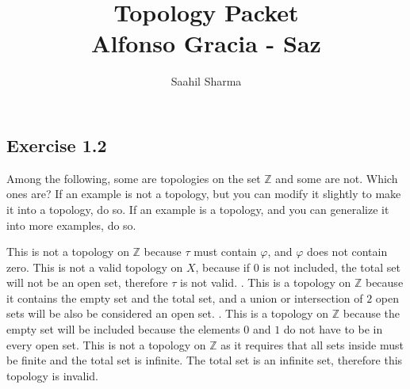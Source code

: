 \documentclass{report}
\title{\Huge{Topology Packet}\\Alfonso Gracia - Saz}
\author{\huge{Saahil Sharma}}
\date{}
\begin{document}
\maketitle
\newpage
{}
\tableofcontents
\pagebreak

\chapter{}
\section{Exercise 1.2}
\begin{center} 
Among the following, some are topologies on the set $\mathbb{Z}$ and some are not. Which ones are? If an example is not a topology, but you can modify it slightly to make it into a topology, do so. If an example is a topology, and you can generalize it into more examples, do so.  
\end{center}
\bigskip
\sol This is not a topology on $\mathbb{Z}$ because $\tau$ must contain $\varphi$, and $\varphi$ does not contain zero.
\bigskip
{}
\bigskip
\sol This is not a valid topology on $X$, because if $0$ is not included, the total set will not be an open set, therefore $\tau$ is not valid.  
\bigskip
{}.
\bigskip
\sol This is a topology on $\mathbb{Z}$ because it contains the empty set and the total set, and a union or intersection of $2$ open sets will be also be considered an open set. 
\bigskip
{}.
\bigskip
\sol This is a topology on $\mathbb{Z}$ because the empty set will be included because the elements $0$ and $1$ do not have to be in every open set.
\bigskip
\sol This is not a topology on $\mathbb{Z}$ as it requires that all sets inside must be finite and the total set is infinite.                                                         
\bigskip
{}
\bigskip
\sol The total set is an infinite set, therefore this topology is invalid. 
\bigskip
\end{document}
